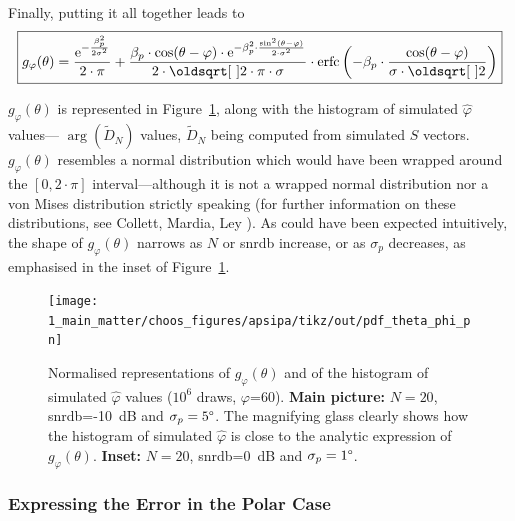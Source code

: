 Finally, putting it all together leads to
\begin{equation}
	\boxed{
		g_\varphi(\theta) = \frac{\e^{-\frac{\beta_p^2}{2 \sigma^2}}}{2\cdot \pi} + \frac{\beta_p \cdot \cos(\theta-\varphi) \cdot \e^{-\beta_p^2 \cdot \frac{\sin^2(\theta - \varphi)}{2\cdot \sigma^2}}}{2 \cdot \sqrt{2 \cdot \pi} \cdot \sigma}
		\cdot \erfc\left(- \beta_p \cdot \frac{\cos(\theta - \varphi)}{\sigma \cdot \sqrt{2}}\right)
	}
\end{equation}

$g_\varphi(\theta)$ is represented in Figure~\ref{fig:choos:apsipa:pdf_theta_phi}, along with the histogram of simulated $\widehat{\varphi}$ values---\ie{} $\arg (\widetilde{D}_N)$ values, $\widetilde{D}_N$ being computed from simulated $S$ vectors. $g_\varphi(\theta)$ resembles a normal distribution which would have been wrapped around the $\left[0,2\cdot\pi\right]$ interval---although it is not a wrapped normal distribution nor a von Mises distribution strictly speaking (for further information on these distributions, see Collett, Mardia, Ley \etal{}\cite{collett1981, mardia2000directional, ley2017modern}). As could have been expected intuitively, the shape of $g_\varphi(\theta)$ narrows as $N$ or \gls{snrdb} increase, or as $\sigma_p$ decreases, as emphasised in the inset of Figure~\ref{fig:choos:apsipa:pdf_theta_phi}.

\begin{figure}
	\centering
	\texttt{[image: 1\_main\_matter/choos\_figures/apsipa/tikz/out/pdf\_theta\_phi\_pn]}
	\caption{Normalised representations of $g_\varphi(\theta)$ and of the histogram of simulated $\widehat{\varphi}$ values ($10^6$ draws, $\varphi$=60{\degree}). \textbf{Main picture:} $N=20$, \gls{snrdb}=-10~dB and $\sigma_p=5{\degree}$. The magnifying glass clearly shows how the histogram of simulated $\widehat{\varphi}$ is close to the analytic expression of $g_\varphi(\theta)$. \textbf{Inset:} $N=20$, \gls{snrdb}=0~dB and $\sigma_p=1{\degree}$.}
	\label{fig:choos:apsipa:pdf_theta_phi}
\end{figure}

\subsubsection{Expressing the Error in the Polar Case}

